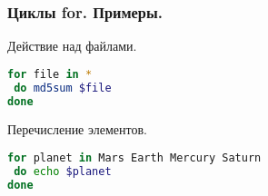 \begin{frame}[fragile]
\frametitle{ Циклы for. Примеры.}
  \begin{block}{Действие над файлами.}
\begin{lstlisting}[language=sh,frame=single]
for file in *
 do md5sum $file
done
\end{lstlisting}
  \end{block}

\begin{block}{Перечисление элементов.}
\begin{lstlisting}[language=sh,frame=single]
for planet in Mars Earth Mercury Saturn
 do echo $planet 
done
\end{lstlisting}
  \end{block}
\end{frame}
